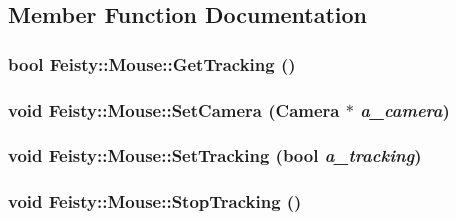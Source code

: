 \subsection{Member Function Documentation}
\hypertarget{class_feisty_1_1_mouse_ace89c4a2ec21bf4fcac54ac17bf7cc39}{
\subsubsection[{GetTracking}]{\setlength{\rightskip}{0pt plus 5cm}bool Feisty::Mouse::GetTracking ()}}
\label{class_feisty_1_1_mouse_ace89c4a2ec21bf4fcac54ac17bf7cc39}
\hypertarget{class_feisty_1_1_mouse_ad6a62deee38522a55f0a5ac4c4c29e5f}{
\subsubsection[{SetCamera}]{\setlength{\rightskip}{0pt plus 5cm}void Feisty::Mouse::SetCamera ({\bf Camera} $\ast$ {\em a\_\-camera})}}
\label{class_feisty_1_1_mouse_ad6a62deee38522a55f0a5ac4c4c29e5f}
\hypertarget{class_feisty_1_1_mouse_a234f0e6ed4ea60f8018fd147a5cfe3dc}{
\subsubsection[{SetTracking}]{\setlength{\rightskip}{0pt plus 5cm}void Feisty::Mouse::SetTracking (bool {\em a\_\-tracking})}}
\label{class_feisty_1_1_mouse_a234f0e6ed4ea60f8018fd147a5cfe3dc}
\hypertarget{class_feisty_1_1_mouse_adf5f8bcd509c14193e883e7709ec6dd9}{
\subsubsection[{StopTracking}]{\setlength{\rightskip}{0pt plus 5cm}void Feisty::Mouse::StopTracking ()}}
